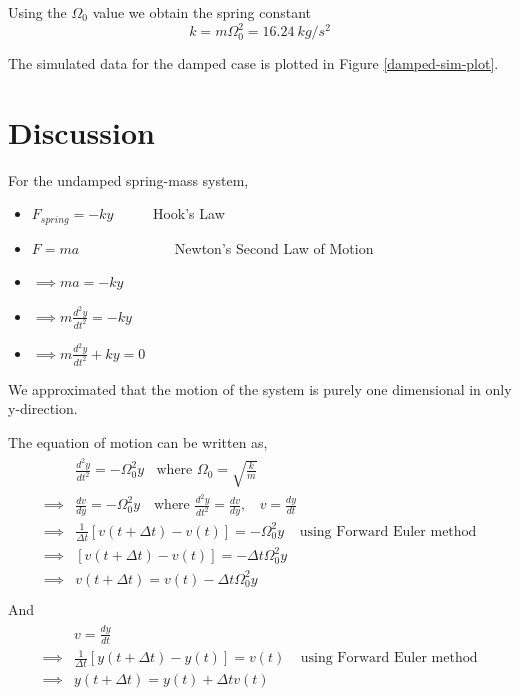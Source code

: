 \documentclass[letterpaper,12pt]{article}
\begin{document}
Using the $\Omega_0$ value we obtain the spring constant $$k = m \Omega^2_0 = 16.24\ kg/s^2$$

The simulated data for the damped case is plotted in Figure \ref{damped-sim-plot}. 

\section{Discussion}

For the undamped spring-mass system,

\begin{itemize}
  \item[] $F_{spring} = -ky$ \ \ \ \ \ Hook's Law
  \item[] $F=ma$ \ \ \ \ \ \ \ \ \ \ \ \ \ Newton's Second Law of Motion
  \item[] $\implies ma = -ky$ 
  \item[] $\implies m\frac{d^2y}{dt^2} = -ky$
  \item[] $\implies m\frac{d^2y}{dt^2} + ky = 0$
\end{itemize}

We approximated that the motion of the system is purely one dimensional in only y-direction.

The equation of motion can be written as,
\begin{eqnarray*}
  \begin{split}
    &\frac{d^2y}{dt^2} = -\Omega_0^2 y \ \ \ \ \text{where } \Omega_0 = \sqrt{\frac{k}{m}} \\
    \implies &\frac{dv}{dy} = -\Omega_0^2 y \ \ \ \text{ where } \frac{d^2y}{dt^2} = \frac{dv}{dy},\ \ \ \  v = \frac{dy}{dt} \\
    \implies &\frac{1}{\Delta t} [v(t+\Delta t) - v(t)] =  -\Omega_0^2 y \ \ \ \ \ \text{using Forward Euler method} \\
    \implies &[v(t+\Delta t) - v(t)] =  -\Delta t \Omega_0^2 y\\
    \implies &v(t+\Delta t) =  v(t) -\Delta t \Omega_0^2 y\\
  \end{split}
\end{eqnarray*}
And 
\begin{eqnarray*}
  \begin{split}
    &v = \frac{dy}{dt} \\
    \implies &\frac{1}{\Delta t} [y(t+\Delta t) - y(t)] =  v(t) \ \ \ \ \ \text{using Forward Euler method} \\
    \implies &y(t+\Delta t) =  y(t) + \Delta t v(t)\\
  \end{split}
\end{eqnarray*}
\end{document}
